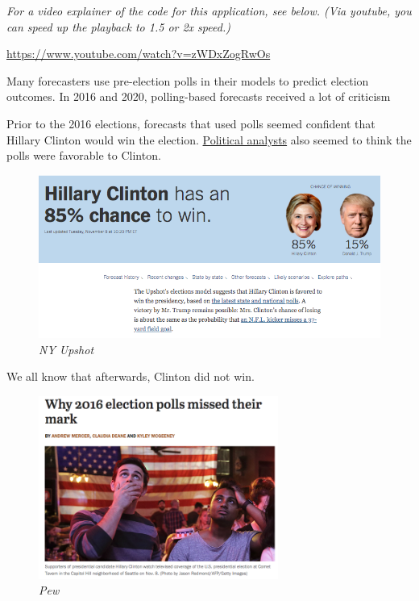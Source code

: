 \documentclass[
  letterpaper,
  DIV=11,
  numbers=noendperiod]{scrreprt}
\begin{document}
\emph{For a video explainer of the code for this application, see below.
(Via youtube, you can speed up the playback to 1.5 or 2x speed.)}

\url{https://www.youtube.com/watch?v=zWDxZogRwOs}

Many forecasters use pre-election polls in their models to predict
election outcomes. In 2016 and 2020, polling-based forecasts received a
lot of criticism

Prior to the 2016 elections, forecasts that used polls seemed confident
that Hillary Clinton would win the election.
\href{https://www.youtube.com/watch?v=zerWCVpXTr8}{Political analysts}
also seemed to think the polls were favorable to Clinton.

\begin{figure}

{\centering \includegraphics{images/clintonupshot.png}

}

\caption{\emph{NY Upshot}}

\end{figure}

We all know that afterwards, Clinton did not win.

\begin{figure}

{\centering \includegraphics[width=0.7\textwidth,height=\textheight]{images/afterpolls.png}

}

\caption{\emph{Pew}}

\end{figure}
\end{document}
